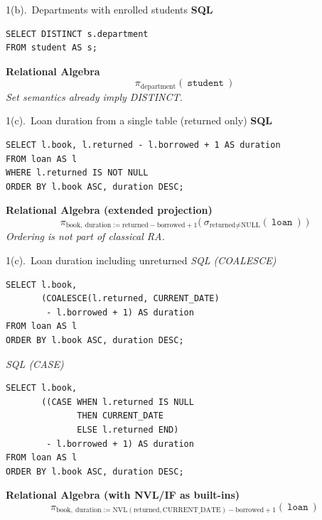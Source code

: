 \documentclass{beamer}
\begin{document}
\begin{frame}[fragile]{1(b).\ Departments with enrolled students}
\small
\textbf{SQL}
\begin{lstlisting}
SELECT DISTINCT s.department
FROM student AS s;
\end{lstlisting}

\medskip
\textbf{Relational Algebra}
\[
\pi_{\text{department}}(\ \texttt{student}\ )
\]
\textit{Set semantics already imply DISTINCT.}
\end{frame}

\begin{frame}[fragile]{1(c).\ Loan duration from a single table (returned only)}
\small
\textbf{SQL}
\begin{lstlisting}[style=sqlcompact]
SELECT l.book, l.returned - l.borrowed + 1 AS duration
FROM loan AS l
WHERE l.returned IS NOT NULL
ORDER BY l.book ASC, duration DESC;
\end{lstlisting}

\medskip
\textbf{Relational Algebra (extended projection)}
\[
\pi_{\text{book},\ \text{duration}:=\text{returned}-\text{borrowed}+1}\Big(
  \ \sigma_{\text{returned}\neq \text{NULL}}(\ \texttt{loan}\ )\ \Big)
\]
\textit{Ordering is not part of classical RA.}
\end{frame}

\begin{frame}[fragile]{1(c).\ Loan duration including unreturned}
\small\itshape SQL (COALESCE)
\begin{lstlisting}[style=sqlcompact]
SELECT l.book,
       (COALESCE(l.returned, CURRENT_DATE)
        - l.borrowed + 1) AS duration
FROM loan AS l
ORDER BY l.book ASC, duration DESC;
\end{lstlisting}

\small\itshape SQL (CASE)
\begin{lstlisting}[style=sqlcompact]
SELECT l.book,
       ((CASE WHEN l.returned IS NULL
              THEN CURRENT_DATE
              ELSE l.returned END)
        - l.borrowed + 1) AS duration
FROM loan AS l
ORDER BY l.book ASC, duration DESC;
\end{lstlisting}

\medskip
\textbf{Relational Algebra (with NVL/IF as built-ins)}
\[
\pi_{\text{book},\ \text{duration}:=\mathrm{NVL}(\text{returned},\mathrm{CURRENT\_DATE})-\text{borrowed}+1}(\ \texttt{loan}\ )
\]
\end{frame}
\end{document}
